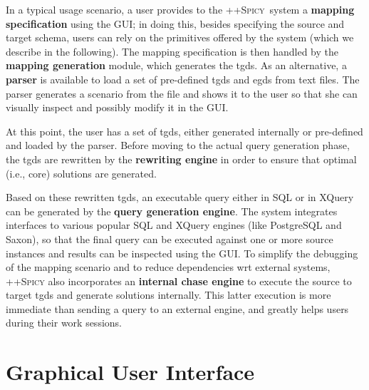 \documentclass[12pt]{article}
\newcommand{\spicypp}{\textsc{++Spicy}}
\begin{document}
In a typical usage scenario, a user provides to the \spicypp\ system a {\bf mapping specification} using the GUI; in doing this, besides specifying the source and target schema, users can rely on the primitives offered by the system (which we describe in the following). 
The mapping specification is then handled by the {\bf mapping generation} module, which generates the tgds. As an alternative, a {\bf parser} is available to load a set of pre-defined tgds and egds from text files. The parser generates a scenario from the file and shows it to the user so that she can visually inspect and possibly modify it in the GUI.

At this point, the user has a set of tgds, either generated internally or pre-defined and loaded by the parser. Before moving to the actual query generation phase, the tgds are rewritten by the {\bf rewriting engine} in order to ensure that optimal (i.e., core) solutions are generated.  

Based on these rewritten tgds, an executable query either in SQL or in XQuery can be generated by the {\bf query generation engine}. The system integrates interfaces to various popular SQL and XQuery engines (like PostgreSQL and Saxon), so that the final query can be executed against one or more source instances and results can be inspected using the GUI. To simplify the debugging of the mapping scenario and to reduce dependencies wrt external systems, {\spicypp} also incorporates an {\bf internal chase engine} to execute the source to target tgds and generate solutions internally. This latter execution is more immediate than sending a query to an external engine, and greatly helps users during their work sessions.




\section{Graphical User Interface} \label{sec:gui}
\end{document}
